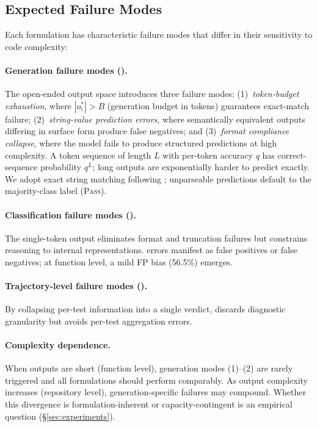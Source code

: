 \subsection{Expected Failure Modes}
\label{sec:failure-modes}

Each formulation has characteristic failure modes that differ in their sensitivity to code complexity:

\paragraph{Generation failure modes (\cwm{}).} The open-ended output space introduces three failure modes: (1)~\emph{token-budget exhaustion}, where $|o_i^*| > B$ (generation budget in tokens) guarantees exact-match failure; (2)~\emph{string-value prediction errors}, where semantically equivalent outputs differing in surface form produce false negatives; and (3)~\emph{format compliance collapse}, where the model fails to produce structured predictions at high complexity. A token sequence of length $L$ with per-token accuracy $q$ has correct-sequence probability $q^L$; long outputs are exponentially harder to predict exactly. We adopt exact string matching following \citet{meta2025cwm}; unparseable predictions default to the majority-class label (\textsc{Pass}).

\paragraph{Classification failure modes (\cls{}).} The single-token output eliminates format and truncation failures but constrains reasoning to internal representations. \cls{} errors manifest as false positives or false negatives; at function level, a mild FP bias (56.5\%) emerges.

\paragraph{Trajectory-level failure modes (\traj{}).} By collapsing per-test information into a single verdict, \traj{} discards diagnostic granularity but avoids per-test aggregation errors.

\paragraph{Complexity dependence.} When outputs are short (function level), generation modes (1)--(2) are rarely triggered and all formulations should perform comparably. As output complexity increases (repository level), generation-specific failures may compound. Whether this divergence is formulation-inherent or capacity-contingent is an empirical question (\S\ref{sec:experiments}).

